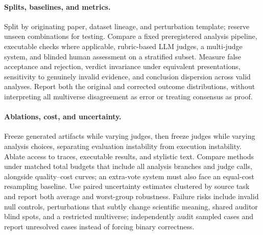 \paragraph{Splits, baselines, and metrics.}
Split by originating paper, dataset lineage, and perturbation template; reserve unseen combinations for testing. Compare a fixed preregistered analysis pipeline, executable checks where applicable, rubric-based LLM judges, a multi-judge system, and blinded human assessment on a stratified subset. Measure false acceptance and rejection, verdict invariance under equivalent presentations, sensitivity to genuinely invalid evidence, and conclusion dispersion across valid analyses. Report both the original and corrected outcome distributions, without interpreting all multiverse disagreement as error or treating consensus as proof.

\paragraph{Ablations, cost, and uncertainty.}
Freeze generated artifacts while varying judges, then freeze judges while varying analysis choices, separating evaluation instability from execution instability. Ablate access to traces, executable results, and stylistic text. Compare methods under matched total budgets that include all analysis branches and judge calls, alongside quality--cost curves; an extra-vote system must also face an equal-cost resampling baseline. Use paired uncertainty estimates clustered by source task and report both average and worst-group robustness. Failure risks include invalid null controls, perturbations that subtly change scientific meaning, shared auditor blind spots, and a restricted multiverse; independently audit sampled cases and report unresolved cases instead of forcing binary correctness.
